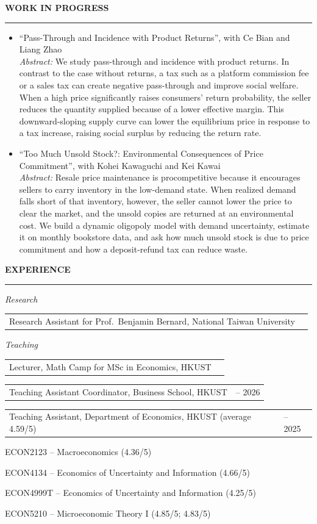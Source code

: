 \documentclass[11pt,letterpaper]{article}
\makeatletter
\newlength{\cvdatecol}
\newcommand{\sectionheader}[1]{%
  \vspace{0.55em}
  {\large\bfseries #1}\\[-0.15em]
  \rule{\textwidth}{0.4pt}\par
  \vspace{0.25em}
}
\newcommand{\cvline}[3][0em]{%
  \par\nobreak
  \noindent\hspace*{#1}%
  \begin{tabularx}{\dimexpr\textwidth-#1\relax}{@{}X@{\hspace{0.75em}}>{\raggedleft\arraybackslash}p{\cvdatecol}@{}}
  #2 & #3 \\
  \end{tabularx}%
}
\newcommand{\courseline}[1]{%
  \par\addvspace{0.28em}%
  \noindent\hspace*{3.2em}#1\par
}
\makeatother
\begin{document}
\sectionheader{WORK IN PROGRESS}
\begin{itemize}
  \item ``Pass-Through and Incidence with Product Returns'', with Ce Bian and Liang Zhao\\[0.2em]
  \textit{Abstract:} We study pass-through and incidence with product returns. In contrast to the case without returns, a tax such as a platform commission fee or a sales tax can create negative pass-through and improve social welfare. When a high price significantly raises consumers' return probability, the seller reduces the quantity supplied because of a lower effective margin. This downward-sloping supply curve can lower the equilibrium price in response to a tax increase, raising social surplus by reducing the return rate.
  \item ``Too Much Unsold Stock?: Environmental Consequences of Price Commitment'', with Kohei Kawaguchi and Kei Kawai\\[0.2em]
  \textit{Abstract:} Resale price maintenance is procompetitive because it encourages sellers to carry inventory in the low-demand state. When realized demand falls short of that inventory, however, the seller cannot lower the price to clear the market, and the unsold copies are returned at an environmental cost. We build a dynamic oligopoly model with demand uncertainty, estimate it on monthly bookstore data, and ask how much unsold stock is due to price commitment and how a deposit-refund tax can reduce waste.
\end{itemize}

\sectionheader{EXPERIENCE}
{
\textit{Research}\\[-0.5em]
\cvline[1.5em]{Research Assistant for Prof.\ Benjamin Bernard, National Taiwan University}{2020}

\vspace{-0.1em}
\textit{Teaching}\\[-0.5em]
\cvline[1.5em]{Lecturer, Math Camp for MSc in Economics, HKUST}{2026}
\vspace{-0.12em}
\cvline[1.5em]{Teaching Assistant Coordinator, Business School, HKUST}{2025 -- 2026}
\vspace{-0.12em}
\cvline[1.5em]{Teaching Assistant, Department of Economics, HKUST (average 4.59/5)}{2020 -- 2025}
\vspace{0.1em}
\courseline{ECON2123 -- Macroeconomics (4.36/5)}
\courseline{ECON4134 -- Economics of Uncertainty and Information (4.66/5)}
\courseline{ECON4999T -- Economics of Uncertainty and Information (4.25/5)}
\courseline{ECON5210 -- Microeconomic Theory I (4.85/5; 4.83/5)}

}
\end{document}
